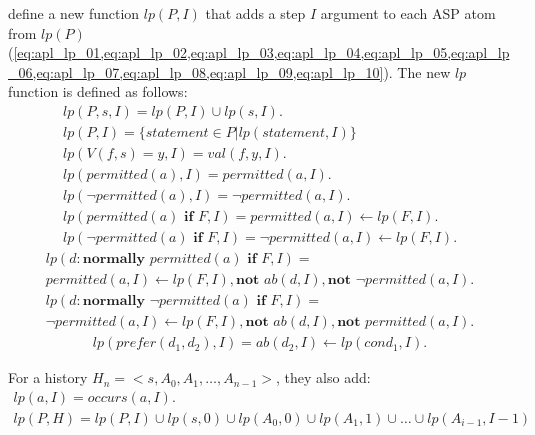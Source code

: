 \citet{gelfond_authorization_2008} define a new function $lp(P, I)$ that adds a step $I$ argument to each ASP atom from $lp(P)$ (\cref{eq:apl_lp_01,eq:apl_lp_02,eq:apl_lp_03,eq:apl_lp_04,eq:apl_lp_05,eq:apl_lp_06,eq:apl_lp_07,eq:apl_lp_08,eq:apl_lp_09,eq:apl_lp_10}).
The new $lp$ function is defined as follows:
\begin{gather}
    lp(P,s,I) = lp(P,I)\cup lp(s,I). \label{eq:apl_lp_inc_01} \\
    lp(P,I)=\{statement \in P | lp(statement,I)\} \label{eq:apl_lp_inc_02} \\
    lp\left(V(f,s)=y,I\right) =
        val\left(f,y,I\right). \label{eq:apl_lp_inc_03} \\
    lp(permitted(a),I) =
        permitted(a, I). \label{eq:apl_lp_inc_04} \\
    lp(\neg permitted(a),I) =
        \neg permitted(a, I). \label{eq:apl_lp_inc_05} \\
    lp(permitted(a) \textbf{ if } F, I) =
        permitted(a, I) \leftarrow
            lp(F, I). \label{eq:apl_lp_inc_06} \\
    lp(\neg permitted(a) \textbf{ if } F, I) =
        \neg permitted(a, I) \leftarrow
            lp(F, I). \label{eq:apl_lp_inc_07}
\end{gather}
\begin{multline}
    \label{eq:apl_lp_inc_08}
    lp(d: \textbf{normally } permitted(a) \textbf{ if } F, I) = \\
        permitted(a, I) \leftarrow
            lp(F, I),
            \textbf{not } ab(d, I),
            \textbf{not } \neg permitted(a, I).
\end{multline}
\begin{multline}
    \label{eq:apl_lp_inc_09}
    lp(d: \textbf{normally } \neg permitted(a) \textbf{ if } F, I) = \\
        \neg permitted(a, I) \leftarrow
            lp(F, I),
            \textbf{not } ab(d, I),
            \textbf{not } permitted(a, I).
\end{multline}
\begin{gather}
    lp(prefer(d_1, d_2), I) =
        ab(d_2, I) \leftarrow lp(cond_1, I). \label{eq:apl_lp_inc_10}
\end{gather}

For a history $H_n=<s, A_0, A_1, \dots, A_{n-1}>$, they also add:
\begin{gather}
    lp(a, I)=occurs(a, I). \\
    lp(P, H) = lp(P, I) \cup lp(s, 0) \cup lp(A_0, 0) \cup lp(A_1, 1) \cup \dots \cup lp(A_{i-1}, I-1)
\end{gather}

